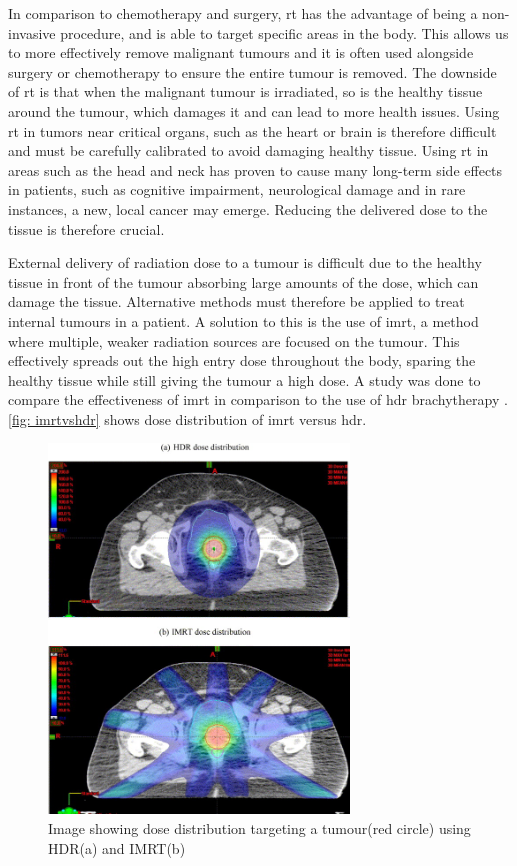 \documentclass[main.tex]{subfiles}
\begin{document}
 In comparison to chemotherapy and surgery, \gls{rt} has the advantage of being a non-invasive procedure, and is able to target specific areas in the body. This allows us to more effectively remove malignant tumours and it is often used alongside surgery or chemotherapy to ensure the entire tumour is removed. The downside of \gls{rt} is that when the malignant tumour is irradiated, so is the healthy tissue around the tumour, which damages it and can lead to more health issues. Using \gls{rt} in tumors near critical organs, such as the heart or brain is therefore difficult and must be carefully calibrated to avoid damaging healthy tissue. Using \gls{rt} in areas such as the head and neck has proven to cause many long-term side effects in patients, such as cognitive impairment, neurological damage and in rare instances, a new, local cancer may emerge\cite{headRTData}. Reducing the delivered dose to the tissue is therefore crucial.
 
 External delivery of radiation dose to a tumour is difficult due to the healthy tissue in front of the tumour absorbing large amounts of the dose, which can damage the tissue. Alternative methods must therefore be applied to treat internal tumours in a patient. A solution to this is the use of \gls{imrt}, a method where multiple, weaker radiation sources are focused on the tumour. This effectively spreads out the high entry dose throughout the body, sparing the healthy tissue while still giving the tumour a high dose. A study was done to compare the effectiveness of \gls{imrt} in comparison to the use of \gls{hdr} brachytherapy \cite{imrtVShdr}. \autoref{fig: imrtvshdr} shows dose distribution of \gls{imrt} versus \gls{hdr}.

 \begin{figure}[!htpb]
    \centering
    \includegraphics[width=8cm ]{images/imrt vs hdr.jpg}
    \caption{Image showing dose distribution targeting a tumour(red circle) using HDR(a) and IMRT(b)\cite{imrtVShdr}}
    \label{fig: imrtvshdr}
\end{figure}
\FloatBarrier 
\end{document}
